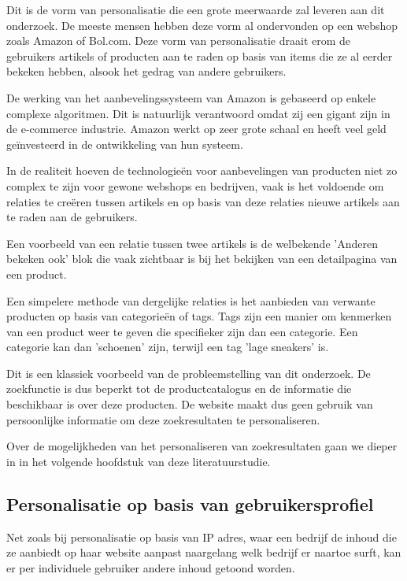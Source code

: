  Dit is de vorm van personalisatie die een grote meerwaarde zal leveren aan dit onderzoek. De meeste mensen hebben deze vorm al ondervonden op een webshop zoals Amazon of Bol.com. Deze vorm van personalisatie draait erom de gebruikers artikels of producten aan te raden op basis van items die ze al eerder bekeken hebben, alsook het gedrag van andere gebruikers.
 
De werking van het aanbevelingssysteem van Amazon is gebaseerd op enkele complexe algoritmen. \autocite{Linden2003} Dit is natuurlijk verantwoord omdat zij een gigant zijn in de e-commerce industrie. Amazon werkt op zeer grote schaal en heeft veel geld geïnvesteerd in de ontwikkeling van hun systeem. 

\newpage
In de realiteit hoeven de technologieën voor aanbevelingen van producten niet zo complex te zijn voor gewone webshops en bedrijven, vaak is het voldoende om relaties te creëren tussen artikels en op basis van deze relaties nieuwe artikels aan te raden aan de gebruikers. 

Een voorbeeld van een relatie tussen twee artikels is de welbekende 'Anderen bekeken ook' blok die vaak zichtbaar is bij het bekijken van een detailpagina van een product. 

Een simpelere methode van dergelijke relaties is het aanbieden van verwante producten op basis van categorieën of tags. Tags zijn een manier om kenmerken van een product weer te geven die specifieker zijn dan een categorie. Een categorie kan dan 'schoenen' zijn, terwijl een tag 'lage sneakers' is. 

Dit is een klassiek voorbeeld van de probleemstelling van dit onderzoek. De zoekfunctie is dus beperkt tot de productcatalogus en de informatie die beschikbaar is over deze producten. De website maakt dus geen gebruik van persoonlijke informatie om deze zoekresultaten te personaliseren.

Over de mogelijkheden van het personaliseren van zoekresultaten gaan we dieper in in het volgende hoofdstuk van deze literatuurstudie.

 \subsection{Personalisatie op basis van gebruikersprofiel}
\label{subsec:Personalisatie op basis van gebruikersprofiel}

Net zoals bij personalisatie op basis van IP adres, waar een bedrijf de inhoud die ze aanbiedt op haar website aanpast naargelang welk bedrijf er naartoe surft, kan er per individuele gebruiker andere inhoud getoond worden. 

